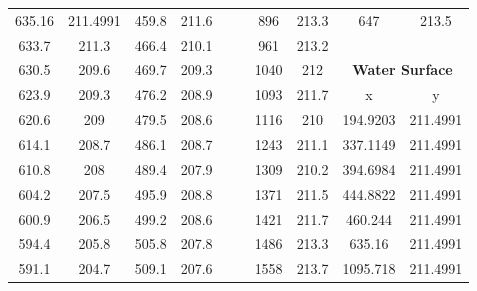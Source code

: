 \begin{center}
\begin{tabular}{|cccc||cccc||cc|}
    635.16   & 211.4991                & 459.8 & 211.6                        &          &                        & 896   & 213.3                        & 647      & 213.5                              \\
    633.7    & 211.3                   & 466.4 & 210.1                        &          &                        & 961   & 213.2                        &          &                                    \\
    630.5    & 209.6                   & 469.7 & 209.3                        &          &                        & 1040  & 212                          & \multicolumn{2}{c|}{\textbf{Water Surface}}   \\ 
    \cline{9-10}
    623.9    & 209.3                   & 476.2 & 208.9                        &          &                        & 1093  & 211.7                        & x        & y                                  \\
    620.6    & 209                     & 479.5 & 208.6                        &          &                        & 1116  & 210                          & 194.9203 & 211.4991                           \\
    614.1    & 208.7                   & 486.1 & 208.7                        &          &                        & 1243  & 211.1                        & 337.1149 & 211.4991                           \\
    610.8    & 208                     & 489.4 & 207.9                        &          &                        & 1309  & 210.2                        & 394.6984 & 211.4991                           \\
    604.2    & 207.5                   & 495.9 & 208.8                        &          &                        & 1371  & 211.5                        & 444.8822 & 211.4991                           \\
    600.9    & 206.5                   & 499.2 & 208.6                        &          &                        & 1421  & 211.7                        & 460.244  & 211.4991                           \\
    594.4    & 205.8                   & 505.8 & 207.8                        &          &                        & 1486  & 213.3                        & 635.16   & 211.4991                           \\
    591.1    & 204.7                   & 509.1 & 207.6                        &          &                        & 1558  & 213.7                        & 1095.718 & 211.4991                           \\

\end{tabular}
\end{center}
